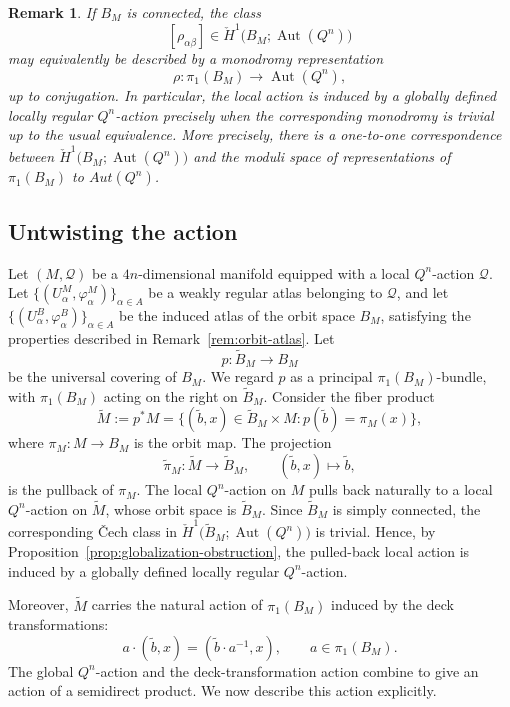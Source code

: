 \documentclass[11pt,a4paper]{article}
\numberwithin{equation}{section}
\newtheorem{remark}[definition]{Remark}
\theoremstyle{named}
\begin{document}
\begin{remark}
If \(B_M\) is connected, the class
\[
[\rho_{\alpha\beta}]
\in
\check H^1
\bigl(B_M;\operatorname{Aut}(Q^n)\bigr)
\]
may equivalently be described by a monodromy representation
\[
\rho:\pi_1(B_M)\longrightarrow\operatorname{Aut}(Q^n),
\]
up to conjugation. In particular, the local action is induced by a globally defined locally regular \(Q^n\)-action precisely when the corresponding monodromy is trivial up to the usual equivalence. More precisely, there is a one-to-one correspondence between \(\check H^1 \bigl(B_M;\operatorname{Aut}(Q^n)\bigr) \) and the moduli space of representations of \(\pi_1(B_M)\) to \(Aut(Q^n)\).
\end{remark}

\subsection{Untwisting the action}
Let \((M,\mathcal Q)\) be a \(4n\)-dimensional manifold equipped with a local \(Q^n\)-action \(\mathcal Q\). Let $\lbrace
(U_\alpha^M,\varphi_\alpha^M)
\rbrace_{\alpha\in A}$
be a weakly regular atlas belonging to \(\mathcal Q\), and let $\lbrace
(U_\alpha^B,\varphi_\alpha^B)
\rbrace_{\alpha\in A}$
be the induced atlas of the orbit space \(B_M\), satisfying the properties described in Remark~\ref{rem:orbit-atlas}. Let
\[
p:\widetilde B_M\longrightarrow B_M
\]
be the universal covering of \(B_M\). We regard \(p\) as a principal \(\pi_1(B_M)\)-bundle, with \(\pi_1(B_M)\) acting on the right on \(\widetilde B_M\). Consider the fiber product
\[
\widetilde M
:=
p^*M
=
\lbrace
(\widetilde b,x)\in\widetilde B_M\times M:
p(\widetilde b)=\pi_M(x)
\rbrace,
\]
where $\pi_M:M\longrightarrow B_M$
is the orbit map. The projection
\[
\widetilde\pi_M:\widetilde M\longrightarrow\widetilde B_M,
\qquad
(\widetilde b,x)\longmapsto\widetilde b,
\]
is the pullback of \(\pi_M\). The local \(Q^n\)-action on \(M\) pulls back naturally to a local \(Q^n\)-action on \(\widetilde M\), whose orbit space is \(\widetilde B_M\). Since \(\widetilde B_M\) is simply connected, the corresponding Čech class in
 $\check H^1
\bigl(\widetilde B_M;\operatorname{Aut}(Q^n)\bigr)$
is trivial. Hence, by Proposition~\ref{prop:globalization-obstruction}, the pulled-back local action is induced by a globally defined locally regular \(Q^n\)-action.

Moreover, \(\widetilde M\) carries the natural action of \(\pi_1(B_M)\) induced by the deck transformations:
\[
a\cdot(\widetilde b,x)
=
(\widetilde b\cdot a^{-1},x),
\qquad
a\in\pi_1(B_M).
\]
The global \(Q^n\)-action and the deck-transformation action combine to give an action of a semidirect product. We now describe this action explicitly.
\end{document}
